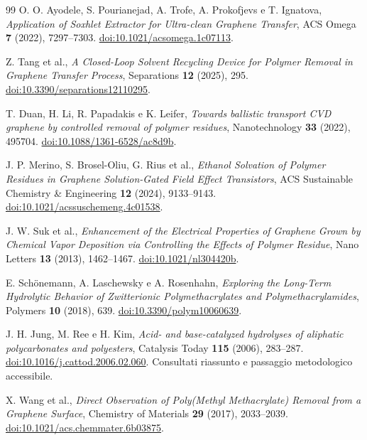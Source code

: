 \documentclass[11pt,reqno]{amsart}
\numberwithin{equation}{section}
\begin{document}
\begin{thebibliography}{99}
O. O. Ayodele, S. Pourianejad, A. Trofe, A. Prokofjevs e T. Ignatova,
\emph{Application of Soxhlet Extractor for Ultra-clean Graphene Transfer},
ACS Omega \textbf{7} (2022), 7297--7303.
\href{https://doi.org/10.1021/acsomega.1c07113}{doi:10.1021/acsomega.1c07113}.

Z. Tang et al., \emph{A Closed-Loop Solvent Recycling Device for Polymer
Removal in Graphene Transfer Process}, Separations \textbf{12} (2025), 295.
\href{https://doi.org/10.3390/separations12110295}{doi:10.3390/separations12110295}.

T. Duan, H. Li, R. Papadakis e K. Leifer,
\emph{Towards ballistic transport CVD graphene by controlled removal of
polymer residues}, Nanotechnology \textbf{33} (2022), 495704.
\href{https://doi.org/10.1088/1361-6528/ac8d9b}{doi:10.1088/1361-6528/ac8d9b}.

J. P. Merino, S. Brosel-Oliu, G. Rius et al.,
\emph{Ethanol Solvation of Polymer Residues in Graphene Solution-Gated
Field Effect Transistors}, ACS Sustainable Chemistry \& Engineering
\textbf{12} (2024), 9133--9143.
\href{https://doi.org/10.1021/acssuschemeng.4c01538}{doi:10.1021/acssuschemeng.4c01538}.

J. W. Suk et al., \emph{Enhancement of the Electrical Properties of Graphene
Grown by Chemical Vapor Deposition via Controlling the Effects of Polymer Residue},
Nano Letters \textbf{13} (2013), 1462--1467.
\href{https://doi.org/10.1021/nl304420b}{doi:10.1021/nl304420b}.

E. Sch\"onemann, A. Laschewsky e A. Rosenhahn,
\emph{Exploring the Long-Term Hydrolytic Behavior of Zwitterionic
Polymethacrylates and Polymethacrylamides}, Polymers \textbf{10} (2018), 639.
\href{https://doi.org/10.3390/polym10060639}{doi:10.3390/polym10060639}.

J. H. Jung, M. Ree e H. Kim,
\emph{Acid- and base-catalyzed hydrolyses of aliphatic polycarbonates and
polyesters}, Catalysis Today \textbf{115} (2006), 283--287.
\href{https://doi.org/10.1016/j.cattod.2006.02.060}{doi:10.1016/j.cattod.2006.02.060}.
Consultati riassunto e passaggio metodologico accessibile.

X. Wang et al., \emph{Direct Observation of Poly(Methyl Methacrylate)
Removal from a Graphene Surface}, Chemistry of Materials
\textbf{29} (2017), 2033--2039.
\href{https://doi.org/10.1021/acs.chemmater.6b03875}{doi:10.1021/acs.chemmater.6b03875}.


\end{thebibliography}
\end{document}
